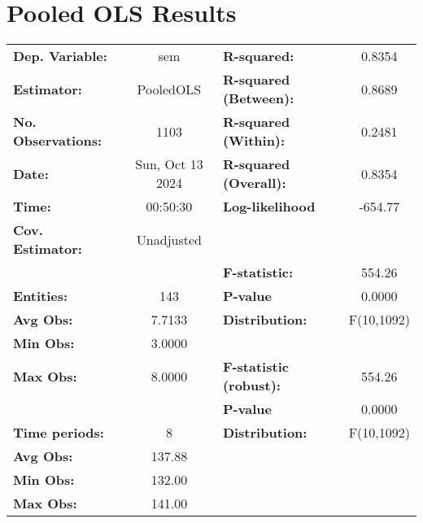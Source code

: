 \documentclass{article}
\begin{document}
\section*{Pooled OLS Results}
\begin{center}
\begin{tabular}{lclc}
\toprule
\textbf{Dep. Variable:}    &        sem         & \textbf{  R-squared:         }   &      0.8354      \\
\textbf{Estimator:}        &     PooledOLS      & \textbf{  R-squared (Between):}  &      0.8689      \\
\textbf{No. Observations:} &        1103        & \textbf{  R-squared (Within):}   &      0.2481      \\
\textbf{Date:}             &  Sun, Oct 13 2024  & \textbf{  R-squared (Overall):}  &      0.8354      \\
\textbf{Time:}             &      00:50:30      & \textbf{  Log-likelihood     }   &     -654.77      \\
\textbf{Cov. Estimator:}   &     Unadjusted     & \textbf{                     }   &                  \\
\textbf{}                  &                    & \textbf{  F-statistic:       }   &      554.26      \\
\textbf{Entities:}         &        143         & \textbf{  P-value            }   &      0.0000      \\
\textbf{Avg Obs:}          &       7.7133       & \textbf{  Distribution:      }   &    F(10,1092)    \\
\textbf{Min Obs:}          &       3.0000       & \textbf{                     }   &                  \\
\textbf{Max Obs:}          &       8.0000       & \textbf{  F-statistic (robust):} &      554.26      \\
\textbf{}                  &                    & \textbf{  P-value            }   &      0.0000      \\
\textbf{Time periods:}     &         8          & \textbf{  Distribution:      }   &    F(10,1092)    \\
\textbf{Avg Obs:}          &       137.88       & \textbf{                     }   &                  \\
\textbf{Min Obs:}          &       132.00       & \textbf{                     }   &                  \\
\textbf{Max Obs:}          &       141.00       & \textbf{                     }   &                  \\

\end{tabular}
\end{center}
\end{document}
